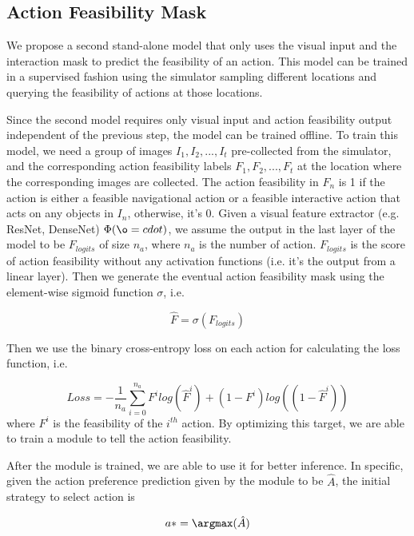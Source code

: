 \documentclass[11pt,a4paper]{article}
\begin{document}
\subsection{Action Feasibility Mask}
We propose a second stand-alone model that only uses the visual input and the interaction mask to predict the feasibility of an action. This model can be trained in a supervised fashion using the simulator sampling different locations and querying the feasibility of actions at those locations. 

Since the second model requires only visual input and action feasibility output independent of the previous step, the model can be trained offline. To train this model, we need a group of images ${I_1, I_2, ..., I_t}$ pre-collected from the simulator, and the corresponding action feasibility labels ${F_1, F_2, ..., F_t}$ at the location where the corresponding images are collected. The action feasibility in $F_n$ is 1 if the action is either a feasible navigational action or a feasible interactive action that acts on any objects in $I_n$, otherwise, it's 0. Given a visual feature extractor (e.g. ResNet, DenseNet) $\Phi(\o=cdot)$, we assume the output in the last layer of the model to be $F_{logits}$ of size $n_a$, where $n_a$ is the number of action. $F_{logits}$ is the score of action feasibility without any activation functions (i.e. it's the output from a linear layer). Then we generate the eventual action feasibility mask using the element-wise sigmoid function $\sigma$, i.e.

\begin{equation}
    \hat{F} = \sigma(F_{logits})
\end{equation}

Then we use the binary cross-entropy loss on each action for calculating the loss function, i.e. 

\begin{equation}
    Loss = -\frac{1}{n_a} \sum^{n_a}_{i=0} F^i log (\hat{F}^i) + (1-F^i) log ((1-\hat{F}^i))
\end{equation}
where $F^i$ is the feasibility of the $i^{th}$ action. By optimizing this target, we are able to train a module to tell the action feasibility.

After the module is trained, we are able to use it for better inference. In specific, given the action preference prediction given by the module to be $\hat{A}$, the initial strategy to select action is 

\begin{equation}
    a* = \argmax(\hat{A})  
\end{equation}
\end{document}
